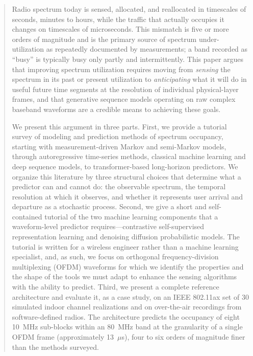 \documentclass[lettersize,journal]{IEEEtran}
\begin{document}
\begin{abstract}
Radio spectrum today is sensed, allocated, and reallocated in timescales of
seconds, minutes to hours, while the traffic that actually occupies it changes on
timescales of microseconds. This mismatch is five or more orders of
magnitude and is the primary source of spectrum under-utilization as repeatedly
documented by measurements; a band recorded as ``busy'' is
typically busy only partly and intermittently. This paper argues
that improving spectrum utilization requires moving from \emph{sensing}
the spectrum in its past or present utilization to \emph{anticipating} what it
will do in useful future time segments at the resolution of individual
physical-layer frames, and that generative sequence models operating on raw
complex baseband waveforms are a credible means to achieving these goals.

We present this argument in three parts. First, we provide a tutorial
survey of modeling and prediction methods of spectrum occupancy, starting
with measurement-driven Markov and semi-Markov models, through
autoregressive time-series methods, classical machine learning and deep
sequence models, to transformer-based long-horizon predictors. We
organize this literature by three structural choices that determine
what a predictor can and cannot do: the observable spectrum, the
temporal resolution at which it observes, and whether it represents user
arrival and departure as a stochastic process. Second, we give a
short and self-contained tutorial of the two machine learning
components that a waveform-level predictor requires---contrastive
self-supervised representation learning and denoising diffusion
probabilistic models. The tutorial is written for a wireless engineer
rather than a machine learning specialist, and, as such, we focus on
orthogonal frequency-division multiplexing (OFDM) waveforms for which we
identify the properties and the shape of the tools we must adapt to enhance the
sensing algorithms with the ability to predict. Third, we present a complete
reference architecture and evaluate it, as a case study, on an IEEE 802.11ax
set of 30 simulated indoor channel realizations and on over-the-air
recordings from software-defined radios. The architecture predicts the
occupancy of eight 10~MHz sub-blocks within an 80~MHz band at the
granularity of a single OFDM frame (approximately 13~$\mu$s), four to six
orders of magnitude finer than the methods surveyed.


\end{abstract}
\end{document}
